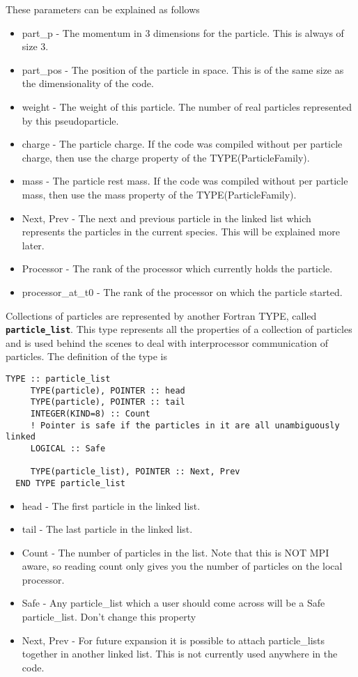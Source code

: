 \documentclass[12pt,a4paper]{article}
\newcommand{\simpleboxverbatim}{\begin{Verbatim}[obeytabs=true,frame=single,
  framerule=0.5mm,rulecolor=\color{warwickmid},formatcom=\color{black}]}
\newcommand{\inlinecode}[1]{{\color{warwickred} \bf\texttt{#1}}}
\begin{document}
These parameters can be explained as follows
\begin{itemize}
\item part\_p - The momentum in 3 dimensions for the particle. This is always
  of size 3.
\item part\_pos - The position of the particle in space. This is of the same
  size as the dimensionality of the code.
\item weight - The weight of this particle. The number of real particles
  represented by this pseudoparticle.
\item charge - The particle charge. If the code was compiled without per
  particle charge, then use the charge property of the TYPE(ParticleFamily).
\item mass - The particle rest mass. If the code was compiled without per
  particle mass, then use the mass property of the TYPE(ParticleFamily).
\item Next, Prev - The next and previous particle in the linked list which
  represents the particles in the current species. This will be explained more
  later.
\item Processor - The rank of the processor which currently holds the
  particle.
\item processor\_at\_t0 - The rank of the processor on which the particle
  started.
\end{itemize}

Collections of particles are represented by another Fortran TYPE, called
\inlinecode{particle\_list}. This type represents all the properties of a
collection of particles and is used behind the scenes to deal with
interprocessor communication of particles. The definition of the type is

\simpleboxverbatim
  TYPE :: particle_list
     TYPE(particle), POINTER :: head
     TYPE(particle), POINTER :: tail
     INTEGER(KIND=8) :: Count
     ! Pointer is safe if the particles in it are all unambiguously linked
     LOGICAL :: Safe

     TYPE(particle_list), POINTER :: Next, Prev
  END TYPE particle_list
\end{Verbatim}
\begin{itemize}
\item head - The first particle in the linked list.
\item tail - The last particle in the linked list.
\item Count - The number of particles in the list. Note that this is NOT MPI
  aware, so reading count only gives you the number of particles on the local
  processor.
\item Safe - Any particle\_list which a user should come across will be a Safe
  particle\_list. Don't change this property
\item Next, Prev - For future expansion it is possible to attach particle\_lists
  together in another linked list. This is not currently used anywhere in the
  code.
\end{itemize}
\end{document}
